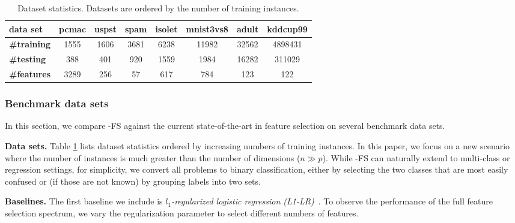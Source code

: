 

\begin{table}[t]
	\begin{center}
\begin{tabular}{|l||c|c|c|c|c|c|c|}
  \hline
  \bf{data set} & pcmac & uspst & spam & isolet & mnist3vs8 & adult & kddcup99\\
  \hline \hline
  \bf{\#training} & 1555 & 1606 & 3681 & 6238 & 11982 & 32562 & 4898431 \\ 
  \hline
  \bf{\#testing} & 388 & 401 & 920 & 1559 & 1984 & 16282 & 311029\\
  \hline 
  \bf{\#features} & 3289 & 256 & 57 & 617 & 784 & 123 & 122 \\
  \hline
\end{tabular}
	\caption{Dataset statistics. Datasets are ordered by the number of training instances.}  \label{table:datasets}
	\end{center}
\end{table}

\subsubsection{Benchmark data sets}
In this section, we compare \name{}-FS against the current state-of-the-art in feature selection on several benchmark data sets.

\textbf{Data sets.}
Table \ref{table:datasets} lists dataset statistics ordered by increasing numbers of training instances. In this paper, we focus on a new scenario where the number of instances is much greater than the number of dimensions ($n \gg p$). While \name{}-FS can naturally extend to multi-class or regression settings, for simplicity, we convert all problems to binary classification, either by selecting the two classes that are most easily confused or (if those are not known) by grouping labels into two sets.

\textbf{Baselines.} 
The first baseline we include is \emph{$l_1$-regularized logistic regression (L1-LR)}~\citep{lee2006efficient,park2007l1}. To observe the performance of the full feature selection spectrum, we vary the regularization parameter to select different numbers of features.


